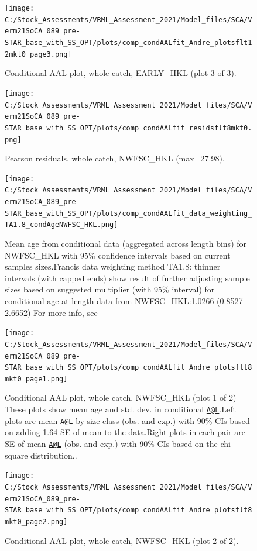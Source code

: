 \documentclass[
  english,
  a4paper,
]{article}
\begin{document}
\begin{figure}
\centering
\texttt{[image: C:/Stock\_Assessments/VRML\_Assessment\_2021/Model\_files/SCA/Verm21SoCA\_089\_pre-STAR\_base\_with\_SS\_OPT/plots/comp\_condAALfit\_Andre\_plotsflt12mkt0\_page3.png]}
\caption{Conditional AAL plot, whole catch, EARLY\_HKL (plot 3 of 3).\label{fig:comp_condAALfit_Andre_plotsflt12mkt0_page3}}
\end{figure}

\begin{figure}
\centering
\texttt{[image: C:/Stock\_Assessments/VRML\_Assessment\_2021/Model\_files/SCA/Verm21SoCA\_089\_pre-STAR\_base\_with\_SS\_OPT/plots/comp\_condAALfit\_residsflt8mkt0.png]}
\caption{Pearson residuals, whole catch, NWFSC\_HKL (max=27.98).\label{fig:comp_condAALfit_residsflt8mkt0}}
\end{figure}

\begin{figure}
\centering
\texttt{[image: C:/Stock\_Assessments/VRML\_Assessment\_2021/Model\_files/SCA/Verm21SoCA\_089\_pre-STAR\_base\_with\_SS\_OPT/plots/comp\_condAALfit\_data\_weighting\_TA1.8\_condAgeNWFSC\_HKL.png]}
\caption{Mean age from conditional data (aggregated across length bins) for NWFSC\_HKL with 95\% confidence intervals based on current samples sizes.Francis data weighting method TA1.8: thinner intervals (with capped ends) show result of further adjusting sample sizes based on suggested multiplier (with 95\% interval) for conditional age-at-length data from NWFSC\_HKL:1.0266 (0.8527-2.6652) For more info, see}
\end{figure}

\begin{figure}
\centering
\texttt{[image: C:/Stock\_Assessments/VRML\_Assessment\_2021/Model\_files/SCA/Verm21SoCA\_089\_pre-STAR\_base\_with\_SS\_OPT/plots/comp\_condAALfit\_Andre\_plotsflt8mkt0\_page1.png]}
\caption{Conditional AAL plot, whole catch, NWFSC\_HKL (plot 1 of 2)
These plots show mean age and std. dev. in conditional \href{mailto:A@L}{\nolinkurl{A@L}}.Left plots are mean \href{mailto:A@L}{\nolinkurl{A@L}} by size-class (obs. and exp.) with 90\% CIs based on adding 1.64 SE of mean to the data.Right plots in each pair are SE of mean \href{mailto:A@L}{\nolinkurl{A@L}} (obs. and exp.) with 90\% CIs based on the chi-square distribution..\label{fig:comp_condAALfit_Andre_plotsflt8mkt0_page1}}
\end{figure}

\begin{figure}
\centering
\texttt{[image: C:/Stock\_Assessments/VRML\_Assessment\_2021/Model\_files/SCA/Verm21SoCA\_089\_pre-STAR\_base\_with\_SS\_OPT/plots/comp\_condAALfit\_Andre\_plotsflt8mkt0\_page2.png]}
\caption{Conditional AAL plot, whole catch, NWFSC\_HKL (plot 2 of 2).\label{fig:comp_condAALfit_Andre_plotsflt8mkt0_page2}}
\end{figure}
\end{document}
